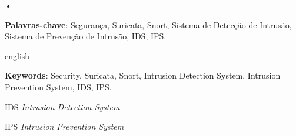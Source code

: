 \documentclass[
	12pt,				%
	openright,			%
	twoside,			%
	a4paper,			%
	english,			%
	brazil				%
	]{abntex2}
\begin{document}
\begin{agradecimentos}

\end{agradecimentos}

\begin{epigrafe}
    \vspace*{\fill}
	\begin{flushright}
		\textit{•}
	\end{flushright}
\end{epigrafe}


\setlength{\absparsep}{18pt} %
\begin{resumo}

 \textbf{Palavras-chave}: Segurança, Suricata, Snort, Sistema de Detecção de Intrusão, Sistema de Prevenção de Intrusão, IDS, IPS.
\end{resumo}

\begin{resumo}[Abstract]
 \begin{otherlanguage*}{english}

   \vspace{\onelineskip}
 
   \noindent 
   \textbf{Keywords}: Security, Suricata, Snort, Intrusion Detection System, Intrusion Prevention System, IDS, IPS.
 \end{otherlanguage*}
\end{resumo}

\listoffigures*
\cleardoublepage

\listoftables*
\cleardoublepage

\begin{siglas}
  \item[IDS] \textit{Intrusion Detection System}
  \item[IPS] \textit{Intrusion Prevention System}
\end{siglas}

\end{document}
